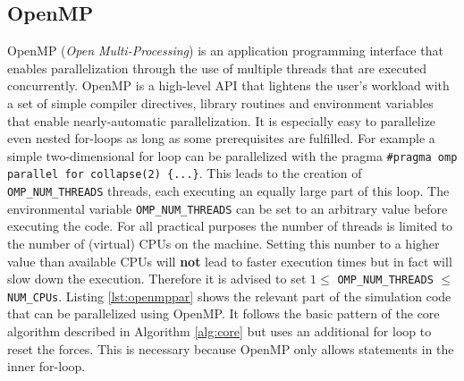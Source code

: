 \documentclass[a4paper,11pt]{scrartcl} %
\begin{document}
\subsection{OpenMP}
OpenMP (\textit{Open Multi-Processing}) is an application programming interface that enables parallelization through the use of multiple threads that are executed concurrently. OpenMP is a high-level API that lightens the user's workload with a set of simple compiler directives, library routines and environment variables that enable nearly-automatic parallelization. It is especially easy to parallelize even nested for-loops as long as some prerequisites are fulfilled. For example a simple two-dimensional for loop can be parallelized with the pragma \texttt{\#pragma omp parallel for collapse(2) \{...\}}. This leads to the creation of \texttt{OMP\_NUM\_THREADS} threads, each executing an equally large part of this loop. The environmental variable \texttt{OMP\_NUM\_THREADS} can be set to an arbitrary value before executing the code. For all practical purposes the number of threads is limited to the number of (virtual) CPUs on the machine. Setting this number to a higher value than available CPUs will \textbf{not} lead to faster execution times but in fact will slow down the execution. Therefore it is advised to set $1 \leq $ \texttt{OMP\_NUM\_THREADS} $\leq $ \texttt{NUM\_CPUs}. Listing \ref{lst:openmppar} shows the relevant part of the simulation code that can be parallelized using OpenMP. It follows the basic pattern of the core algorithm described in Algorithm \ref{alg:core} but uses an additional for loop to reset the forces. This is necessary because OpenMP only allows statements in the inner for-loop.\\


\end{document}
